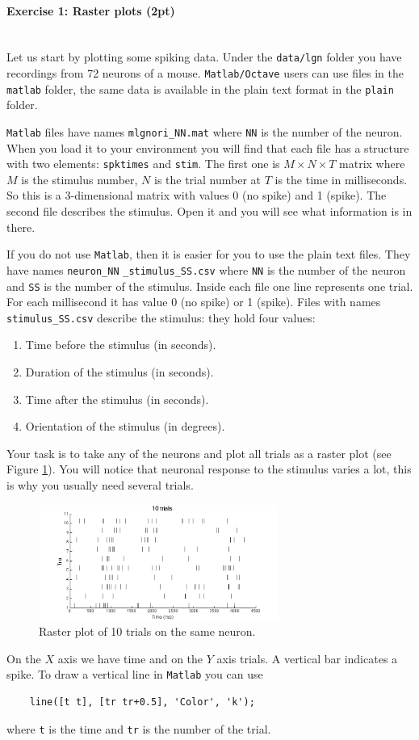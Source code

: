 \documentclass[a4paper,11pt]{article}
\newenvironment{exercise}[3]{\paragraph{Exercise #1: #2 (#3pt)}\ \\}{
\medskip}
\begin{document}
\begin{exercise}{1}{Raster plots}{2}
Let us start by plotting some spiking data. Under the \texttt{data/lgn} folder you have recordings from 72 neurons of a mouse. \texttt{Matlab/Octave} users can use files in the \texttt{matlab} folder, the same data is available in the plain text format in the \texttt{plain} folder.

\texttt{Matlab} files have names \texttt{mlgnori\_NN.mat} where \texttt{NN} is the number of the neuron. When you load it to your environment you will find that each file has a structure with two elements: \texttt{spktimes} and \texttt{stim}. The first one is $M\times N \times T$ matrix where $M$ is the stimulus number, $N$ is the trial number at $T$ is the time in milliseconds. So this is a 3-dimensional matrix with values 0 (no spike) and 1 (spike). The second file describes the stimulus. Open it and you will see what information is in there.

If you do not use \texttt{Matlab}, then it is easier for you to use the plain text files. They have names \texttt{neuron\_NN} \texttt{\_stimulus\_SS.csv} where \texttt{NN} is the number of the neuron and \texttt{SS} is the number of the stimulus. Inside each file one line represents one trial. For each millisecond it has value 0 (no spike) or 1 (spike). Files with names \texttt{stimulus\_SS.csv} describe the stimulus: they hold four values:
\begin{enumerate}
\itemsep 0em
	\item Time before the stimulus (in seconds).
	\item Duration of the stimulus (in seconds).
	\item Time after the stimulus (in seconds).
	\item Orientation of the stimulus (in degrees).
\end{enumerate}
Your task is to take any of the neurons and plot all trials as a raster plot (see Figure \ref{fig:raster_plot}). You will notice that neuronal response to the stimulus varies a lot, this is why you usually need several trials.
\begin{figure}[H]
   \centering
   \includegraphics[width=0.7\textwidth]{raster10tr.png} 
   \caption{Raster plot of 10 trials on the same neuron.}
   \label{fig:raster_plot}
\end{figure}
On the $X$ axis we have time and on the $Y$ axis trials. A vertical bar indicates a spike. To draw a vertical line in \texttt{Matlab} you can use
\begin{verbatim}
	line([t t], [tr tr+0.5], 'Color', 'k');
\end{verbatim}
where \texttt{t} is the time and \texttt{tr} is the number of the trial.
\ \\


\end{exercise}
\end{document}
